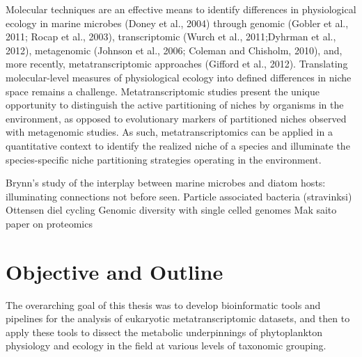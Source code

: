 Molecular techniques are an effective means to identify differences in physiological ecology in marine microbes (Doney et al., 2004) through genomic (Gobler et al., 2011; Rocap et al., 2003), transcriptomic (Wurch et al., 2011;Dyhrman et al., 2012), metagenomic (Johnson et al., 2006; Coleman and Chisholm, 2010), and, more recently, metatranscriptomic approaches (Gifford et al., 2012). Translating molecular-level measures of physiological ecology into defined differences in niche space remains a challenge. Metatranscriptomic studies present the unique opportunity to distinguish the active partitioning of niches by organisms in the environment, as opposed to evolutionary markers of partitioned niches observed with metagenomic studies. As such, metatranscriptomics can be applied in a quantitative context to identify the realized niche of a species and illuminate the species-specific niche partitioning strategies operating in the environment.

Brynn's study of the interplay between marine microbes and diatom hosts: illuminating connections not before seen. 
Particle associated bacteria (stravinksi)
Ottensen diel cycling
Genomic diversity with single celled genomes
Mak saito paper on proteomics

\section{Objective and Outline}
The overarching goal of this thesis was to develop bioinformatic tools and pipelines for the analysis of eukaryotic metatranscriptomic datasets, and then to apply these tools to dissect the metabolic underpinnings of phytoplankton physiology and ecology in the field at various levels of taxonomic grouping. \par

